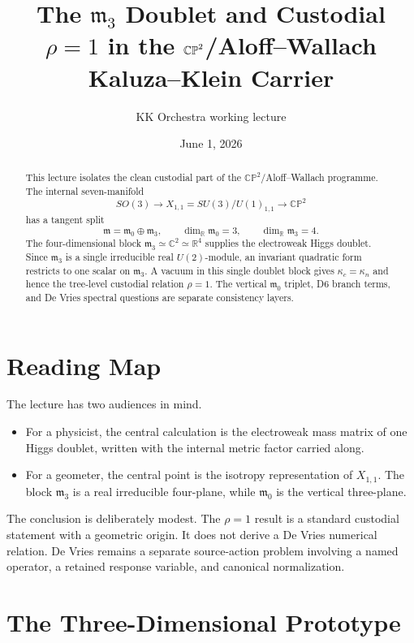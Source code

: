 \documentclass[11pt]{article}
\title{The \texorpdfstring{$\mathfrak m_3$}{m3} Doublet and Custodial
\texorpdfstring{$\rho=1$}{rho=1} in the
\texorpdfstring{$\CP^2$}{CP2}/Aloff--Wallach Kaluza--Klein Carrier}
\author{KK Orchestra working lecture}
\date{June 1, 2026}
\newcommand{\CP}{\mathbb{CP}}
\newcommand{\RR}{\mathbb{R}}
\newcommand{\CC}{\mathbb{C}}
\newcommand{\mzero}{\mathfrak m_0}
\newcommand{\mthree}{\mathfrak m_3}
\begin{document}
\maketitle

\begin{abstract}
This lecture isolates the clean custodial part of the
\(\CP^2\)/Aloff--Wallach programme.  The internal seven-manifold
\[
SO(3)\longrightarrow X_{1,1}=SU(3)/U(1)_{1,1}\longrightarrow \CP^2
\]
has a tangent split
\[
\mathfrak m=\mzero\oplus\mthree,\qquad
\dim_{\RR}\mzero=3,\qquad \dim_{\RR}\mthree=4 .
\]
The four-dimensional block \(\mthree\simeq \CC^2\simeq\RR^4\) supplies the
electroweak Higgs doublet.  Since \(\mthree\) is a single irreducible real
\(U(2)\)-module, an invariant quadratic form restricts to one scalar on
\(\mthree\).  A vacuum in this single doublet block gives
\(\kappa_c=\kappa_n\) and hence the tree-level custodial relation
\(\rho=1\).  The vertical \(\mzero\) triplet, D6 branch terms, and De Vries
spectral questions are separate consistency layers.
\end{abstract}

\tableofcontents

\section{Reading Map}

The lecture has two audiences in mind.

\begin{itemize}[leftmargin=2em]
  \item For a physicist, the central calculation is the electroweak
  mass matrix of one Higgs doublet, written with the internal metric factor
  carried along.
  \item For a geometer, the central point is the isotropy representation
  of \(X_{1,1}\).  The block \(\mthree\) is a real irreducible four-plane,
  while \(\mzero\) is the vertical three-plane.
\end{itemize}

The conclusion is deliberately modest.  The \(\rho=1\) result is a
standard custodial statement with a geometric origin.  It does not derive a
De Vries numerical relation.  De Vries remains a separate source-action
problem involving a named operator, a retained response variable, and
canonical normalization.

\section{The Three-Dimensional Prototype}
\end{document}
